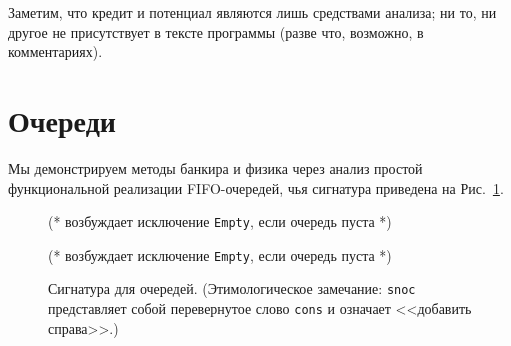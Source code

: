 Заметим, что кредит и потенциал являются лишь средствами анализа; ни
то, ни другое не присутствует в тексте программы (разве что, возможно,
в комментариях).

\section{Очереди}
\label{sc:5.2}

Мы демонстрируем методы банкира и физика через анализ простой
функциональной реализации FIFO-очередей, чья сигнатура приведена на
Рис.~\ref{fig:5.1}.

\begin{figure}

  \centering

  (* возбуждает исключение \lstinline!Empty!, если очередь пуста *)

  (* возбуждает исключение \lstinline!Empty!, если очередь пуста *)

  \caption{Сигнатура для очередей. (Этимологическое замечание:
    \lstinline!snoc! представляет собой перевернутое слово
    \lstinline!cons! и означает <<добавить справа>>.)}
  \label{fig:5.1}  
\end{figure}

